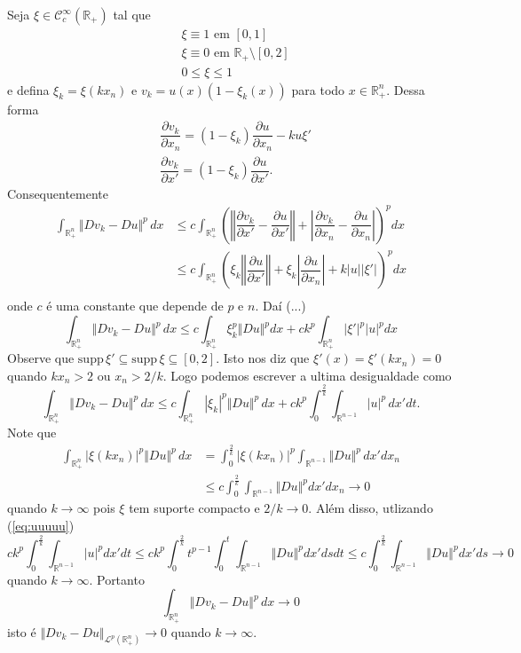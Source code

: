 \documentclass[a4paper, 11pt]{book}
\theoremstyle{definition}
\newcommand{\bR}{\mathbb{R}}
\newcommand{\cC}{\mathcal{C}}
\newcommand{\cL}{\mathcal{L}}
\newcommand{\supp}{\mathrm{supp}\,}
\begin{document}
\begin{prf}
    Seja $\xi \in \cC^{\infty}_c(\bR_+)$ tal que
    \[
        \begin{aligned}
            &\xi \equiv 1 \text{ em } [0,1]\\
            &\xi \equiv 0 \text{ em } \bR_+ \setminus [0,2]\\
            &0 \leqslant \xi \leqslant 1
        \end{aligned}
    \]
    e defina $\xi_k = \xi(kx_n)$ e $v_k = u(x) (1 - \xi_k(x))$ para todo $x \in \bR^n_+$. Dessa forma
    \[
        \begin{aligned}
            &\dfrac{\partial v_k}{\partial x_n} = (1 - \xi_k)\dfrac{\partial u}{\partial x_n} - ku\xi'\\
            &\dfrac{\partial v_k}{\partial x'} = (1-\xi_k)\dfrac{\partial u}{\partial x'}.
        \end{aligned}
    \]
    Consequentemente
    \[
        \begin{aligned}
            \int_{\bR^n_+} \Vert Dv_k - Du \Vert^p \,dx &\leqslant c \int_{\bR^n_+} \left( \left\Vert \dfrac{\partial v_k}{\partial x'} - \dfrac{\partial u}{\partial x'} \right\Vert + \left| \dfrac{\partial v_k}{\partial x_n} - \dfrac{\partial u}{\partial x_n} \right| \right)^p dx\\
            &\leqslant c  \int_{\bR^n_+} \left( \xi_k\left\Vert \dfrac{\partial u}{\partial x'} \right\Vert + \xi_k \left| \dfrac{\partial u}{\partial x_n}\right| + k |u| |\xi'|  \right)^p dx\\ 
        \end{aligned}
    \]
    onde $c$ é uma constante que depende de $p$ e $n$. Daí (...)
    \[
        \int_{\bR^n_+} \Vert Dv_k - Du \Vert^p \,dx \leqslant c \int_{\bR^n_+} \xi_k^p \Vert Du \Vert^p dx + ck^p \int_{\bR^n_+} |\xi'|^p |u|^p dx
    \]
    Observe que $\supp \xi' \subseteq \supp \xi \subseteq [0,2]$. Isto nos diz que $\xi'(x) = \xi'(kx_n) = 0$ quando $kx_n > 2$ ou $x_n > 2/k$.
    Logo podemos escrever a ultima desigualdade como
    \[
        \int_{\bR^n_+} \Vert Dv_k - Du \Vert^p \,dx \leqslant c \int_{\bR^{n}_+} |\xi_k|^p \Vert Du \Vert^p \,dx + ck^p \int_{0}^{\frac{2}{k}} \int_{\bR^{n-1}} |u|^p \,dx'dt.
    \]
    Note que
    \[
        \begin{aligned}
            \int_{\bR^{n}_+} |\xi(kx_n)|^p \Vert Du \Vert^p \,dx &= \int_{0}^{\frac{2}{k}} |\xi(kx_n)|^p \int_{\bR^{n-1}} \Vert Du \Vert^p \,dx' dx_n\\
            &\leqslant c \int_{0}^{\frac{2}{k}} \int_{\bR^{n-1}} \Vert Du \Vert^p dx' dx_n \longrightarrow 0
        \end{aligned}
    \]
    quando $k \to \infty$ pois $\xi$ tem suporte compacto e $2/k \to 0$.
    Além disso, utlizando (\ref{eq:uuuuu})
    \[
        ck^p \int_{0}^{\frac{2}{k}} \int_{\bR^{n-1}} |u|^p dx'dt \leqslant ck^p \int_{0}^{\frac{2}{k}} t^{p-1} \int_{0}^{t} \int_{\bR^{n-1}} \Vert Du \Vert^p dx'ds dt \leqslant c \int_0^{\frac{2}{k}} \int_{\bR^{n-1}} \Vert Du \Vert^p dx'ds \to 0
    \]
    quando $k \to \infty$.
    Portanto
    \[
        \int_{\bR^n_+} \Vert Dv_k - Du \Vert^p \,dx \to 0
    \]
    isto é $\Vert Dv_k - Du \Vert_{\cL^p(\bR^n_+)} \to 0$ quando $k \to \infty$.


\end{prf}
\end{document}
